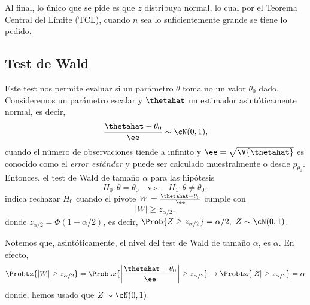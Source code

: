 Al final, lo único que se pide es que $z$ distribuya normal, lo cual por el Teorema Central del Límite (TCL), cuando $n$ sea lo suficientemente grande se tiene lo pedido.

\subsection{Test de Wald} 
\label{sub:test_de_wald}

Este test nos permite evaluar si un parámetro $\theta$ toma no un valor $\theta_0$ dado. Consideremos un parámetro escalar y $\thetahat$ un estimador asintóticamente normal, es decir, 
\begin{equation}
	\frac{\thetahat - \theta_0}{\ee} \sim \cN(0,1),
\end{equation}
cuando el número de observaciones tiende a infinito y $\ee=\sqrt{\V{\thetahat}}$ es conocido como el \emph{error estándar} y puede ser calculado muestralmente o desde $p_{\theta_0}$. Entonces, el test de Wald de tamaño $\alpha$ para las hipótesis 
	\begin{equation}
		H_0:\theta =\theta_0\quad \text{v.s.}\quad H_1:\theta \neq \theta_0,
	\end{equation}
indica rechazar $H_0$ cuando el pivote $W=\frac{\thetahat - \theta_0}{\ee}$ cumple con 
\begin{equation}
	|W|\geq z_{\alpha/2},
\end{equation}
donde $z_{\alpha/2}=\Phi(1-\alpha/2)$, es decir, $\Prob{Z\geq z_{\alpha/2}}=\alpha/2,\ Z\sim\cN(0,1)$. 

\begin{remark}
	Notemos que, asintóticamente, el nivel del test de Wald de tamaño  $\alpha$, es $\alpha$. En efecto, 
\begin{equation}
	\Probtz{|W|\geq z_{\alpha/2}} = \Probtz{\left|\frac{\thetahat - \theta_0}{\ee}\right|\geq z_{\alpha/2}} \rightarrow  \Probtz{|Z|\geq z_{\alpha/2}} = \alpha
\end{equation}
donde, hemos usado que $Z\sim\cN(0,1)$.
\end{remark}


